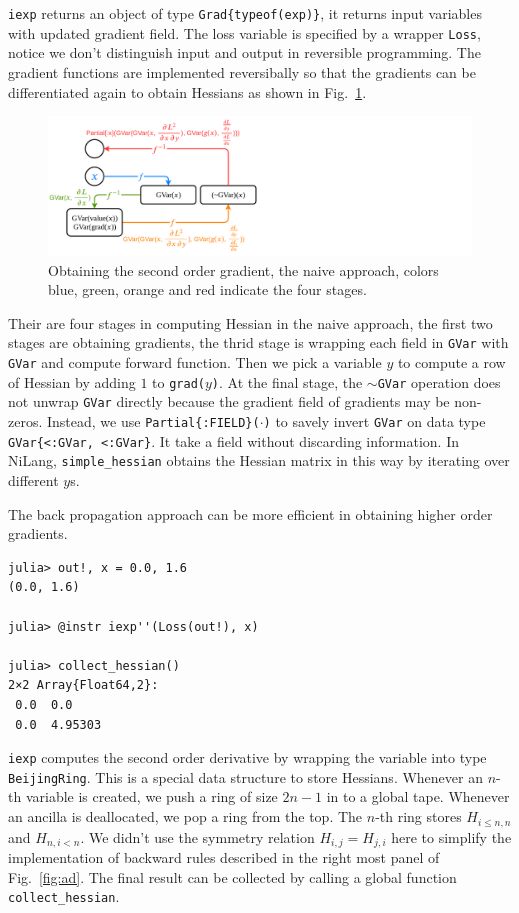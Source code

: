 \documentclass[aps,twocolumn,longbibliography,english,superscriptaddress,prr]{revtex4-1}
\newcommand{\<}{\langle}
\renewcommand{\>}{\rangle}
\newcommand{\Fig}[1]{Fig.~\ref{#1}}
\theoremstyle{definition}\newtheorem{definition}{\textit{Definition}}
\begin{document}
\texttt{iexp\textquotesingle} returns an object of type \texttt{Grad\{typeof(exp)\}}, it returns input variables with updated gradient field.
The loss variable is specified by a wrapper \texttt{Loss}, notice we don't distinguish input and output in reversible programming.
The gradient functions are implemented reversibally so that the gradients can be differentiated again to obtain Hessians as shown in \Fig{fig:simplehessian}.

\begin{figure}[h]
    \centerline{\includegraphics[width=0.9\columnwidth,trim={0 0cm 11cm 0cm},clip]{images/simplehessian.pdf}}
    \caption{Obtaining the second order gradient, the naive approach, colors blue, green, orange and red indicate the four stages.}\label{fig:simplehessian}
\end{figure}

Their are four stages in computing Hessian in the naive approach, the first two stages are obtaining gradients, the thrid stage is wrapping each field in \texttt{GVar} with \texttt{GVar} and compute forward function. Then we pick a variable $y$ to compute a row of Hessian by adding $1$ to \texttt{grad($y$)}. At the final stage, the \texttt{$\sim$GVar} operation does not unwrap \texttt{GVar} directly because the gradient field of gradients may be non-zeros. Instead, we use \texttt{Partial\{:FIELD\}($\cdot$)} to savely invert \texttt{GVar} on data type \texttt{GVar\{<:GVar, <:GVar\}}. It take a field without discarding information. In NiLang, \texttt{simple\_hessian} obtains the Hessian matrix in this way by iterating over different $y$s.

The back propagation approach can be more efficient in obtaining higher order gradients.

\begin{minipage}{.44\textwidth}
\begin{lstlisting}
julia> out!, x = 0.0, 1.6
(0.0, 1.6)

julia> @instr iexp''(Loss(out!), x)

julia> collect_hessian()
2×2 Array{Float64,2}:
 0.0  0.0
 0.0  4.95303
\end{lstlisting}
\end{minipage}
\texttt{iexp\textquotesingle\textquotesingle} computes the second order derivative by wrapping the variable into type \texttt{BeijingRing}. This is a special data structure to store Hessians. Whenever an $n$-th variable is created, we push a ring of size $2n-1$ in to a global tape. Whenever an ancilla is deallocated, we pop a ring from the top. The $n$-th ring stores $H_{i\leq n,n}$ and $H_{n,i<n}$. We didn't use the symmetry relation $H_{i,j} = H_{j,i}$ here to simplify the implementation of backward rules described in the right most panel of \Fig{fig:ad}.
The final result can be collected by calling a global function \texttt{collect\_hessian}.
\end{document}

